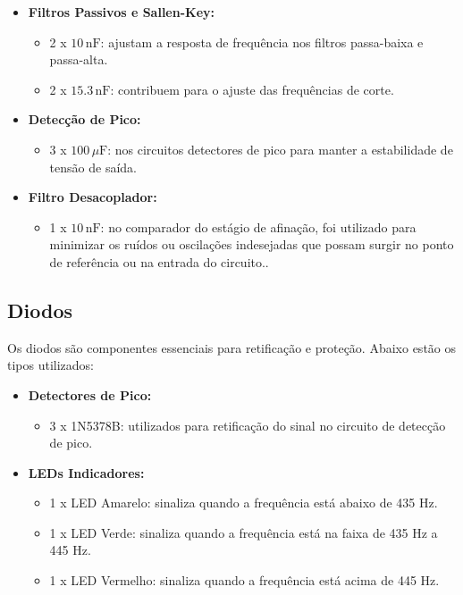 \documentclass[a4paper, 12pt]{article}
\begin{document}
\begin{itemize}
    \item \textbf{Filtros Passivos e Sallen-Key:}
    \begin{itemize}
        \item 2 x $10 \, \text{nF}$: ajustam a resposta de frequência nos filtros passa-baixa e passa-alta.
        \item 2 x $15.3 \, \text{nF}$: contribuem para o ajuste das frequências de corte.
    \end{itemize}
    
    \item \textbf{Detecção de Pico:}
    \begin{itemize}
        \item 3 x $100 \, \mu \text{F}$: nos circuitos detectores de pico para manter a estabilidade de tensão de saída.
    \end{itemize}

    \item \textbf{Filtro Desacoplador:}
    \begin{itemize}
        \item 1 x $10 \,  \text{nF}$: no comparador do estágio de afinação, foi utilizado para minimizar os ruídos ou oscilações indesejadas que possam surgir no ponto de referência ou na entrada do circuito..
    \end{itemize}
\end{itemize}

\subsection{Diodos}

Os diodos são componentes essenciais para retificação e proteção. Abaixo estão os tipos utilizados:

\begin{itemize}
    \item \textbf{Detectores de Pico:}
    \begin{itemize}
        \item 3 x 1N5378B: utilizados para retificação do sinal no circuito de detecção de pico.
    \end{itemize}
    
    \item \textbf{LEDs Indicadores:}
    \begin{itemize}
        \item 1 x LED Amarelo: sinaliza quando a frequência está abaixo de 435 Hz.
        \item 1 x LED Verde: sinaliza quando a frequência está na faixa de 435 Hz a 445 Hz.
        \item 1 x LED Vermelho: sinaliza quando a frequência está acima de 445 Hz.
    \end{itemize}
\end{itemize}
\end{document}

